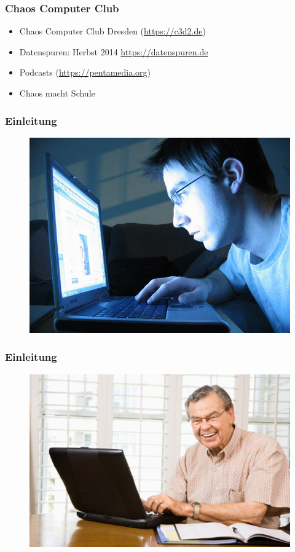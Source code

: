 \documentclass[12pt]{beamer}
\begin{document}
\begin{frame}
    \frametitle{Chaos Computer Club}
    \begin{itemize}
      \item<1-> Chaos Computer Club Dresden (\url{https://c3d2.de})
          \note{}
      \item<2-> Datenspuren: Herbst 2014 \url{https://datenspuren.de}
      \item<3-> Podcasts (\url{https://pentamedia.org})
      \item<4-> Chaos macht Schule
    \end{itemize}
\end{frame}

\begin{frame}
  \frametitle{Einleitung}
  \begin{figure}
    \includegraphics[height=0.7\textheight]{img/internet_user1.jpg}
  \end{figure}
\end{frame}

\begin{frame}
  \frametitle{Einleitung}
  \begin{figure}
    \includegraphics[height=0.7\textheight]{img/internet_user3.jpg}
  \end{figure}
\end{frame}
\end{document}
